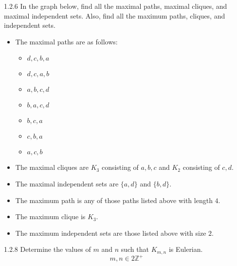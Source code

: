\documentclass[10pt]{extarticle}
\begin{document}
  \begin{problem}{1.2.6}
    In the graph below, find all the maximal paths, maximal cliques, and maximal independent sets. Also, find all the maximum paths, cliques, and independent sets. 
      \begin{center}
      \end{center}
      \tcblower
    \begin{itemize}
        \item The maximal paths are as follows:
       \begin{itemize}
         \item $d,c,b,a$
         \item $d,c,a,b$
         \item $a,b,c,d$
         \item $b,a,c,d$
         \item $b,c,a$
         \item $c,b,a$
         \item $a,c,b$
       \end{itemize}
     \item The maximal cliques are $K_3$ consisting of $a,b,c$ and $K_2$ consisting of $c,d$.
     \item The maximal independent sets are $\{a,d\}$ and  $\{b,d\}$.
     \item The maximum path is any of those paths listed above with length $4$.
     \item The maximum clique is $K_3$.
     \item The maximum independent sets are those listed above with size $2$.
    \end{itemize}
  \end{problem}
  \begin{problem}{1.2.8}
    Determine the values of $m$ and $n$ such that $K_{m,n}$ is Eulerian. 
    \tcblower
    \[
      m,n\in 2\mathbb{Z}^{+}
    \]
  \end{problem}
\end{document}
